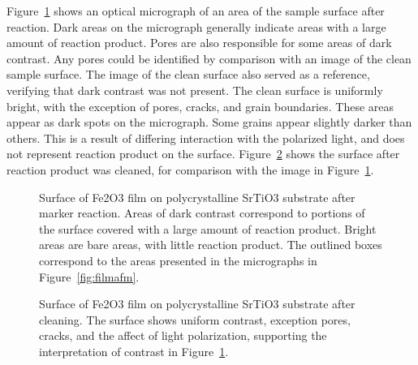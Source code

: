 \documentclass[12pt,%
              twoside,
               letterpaper]{uiothesis}
\begin{document}
Figure~\ref{fig:filmoptical} shows an optical micrograph of an area of the sample surface after
reaction. Dark areas on the micrograph generally indicate areas with a large amount of
reaction product. Pores are also responsible for some areas of dark contrast. Any pores
could be identified by comparison with an image of the clean sample surface. The image of
the clean surface also served as a reference, verifying that dark contrast was not
present. The clean surface is uniformly bright, with the exception of pores, cracks, and
grain boundaries. These areas appear as dark spots on the micrograph. Some grains appear
slightly darker than others. This is a result of differing interaction with the polarized
light, and does not represent reaction product on the surface. Figure~\ref{fig:filmclean} shows
the surface after reaction product was cleaned, for comparison with the image in
Figure~\ref{fig:filmoptical}.
\begin{figure}
\begin{center}
		\caption[Film surface after reaction]{%
			Surface of Fe2O3 film on polycrystalline
			SrTiO3 substrate after marker reaction. Areas
			of dark contrast correspond to portions of the surface
			covered with a large amount of reaction product.
			Bright areas are bare areas, with little reaction
			product. The outlined boxes correspond to the areas
			presented in the  micrographs in Figure~\ref{fig:filmafm}. }
	\label{fig:filmoptical}
	\end{center} 
\end{figure}
%
%
\begin{figure}
\begin{center}
\caption[Cleaned film surface]{%
	Surface of Fe2O3 film on polycrystalline SrTiO3 
	substrate after cleaning. The surface shows uniform contrast, exception pores, cracks,
and the affect of light polarization,
	supporting the interpretation of contrast in Figure~\ref{fig:filmoptical}.}
\label{fig:filmclean}
\end{center}
\end{figure}
\end{document}
